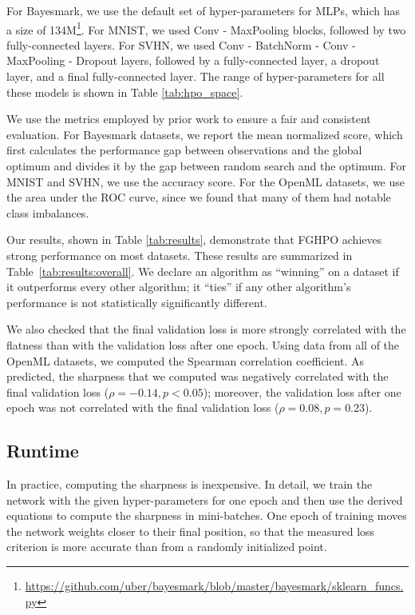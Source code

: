 \documentclass[preprint,12pt]{elsarticle}
\newcommand{\IT}{FGHPO}
\begin{document}
For Bayesmark, we use the default set of hyper-parameters for MLPs, which has a size of 134M\footnote{\url{https://github.com/uber/bayesmark/blob/master/bayesmark/sklearn_funcs.py}}. For MNIST, we used Conv - MaxPooling blocks, followed by two fully-connected layers. For SVHN, we used Conv - BatchNorm - Conv - MaxPooling - Dropout layers, followed by a fully-connected layer, a dropout layer, and a final fully-connected layer. The range of hyper-parameters for all these models is shown in Table \ref{tab:hpo_space}.

We use the metrics employed by prior work to ensure a fair and consistent evaluation. For Bayesmark datasets, we report the mean normalized score, which first calculates the performance gap between observations and the global optimum and divides it by the gap between random search and the optimum. For MNIST and SVHN, we use the accuracy score. For the OpenML datasets, we use the area under the ROC curve, since we found that many of them had notable class imbalances.



Our results, shown in Table \ref{tab:results}, demonstrate that {\IT} achieves strong performance on most datasets. These results are summarized in Table~\ref{tab:results:overall}. We declare an algorithm as ``winning'' on a dataset if it outperforms every other algorithm; it ``ties'' if any other algorithm's performance is not statistically significantly different.

We also checked that the final validation loss is more strongly correlated with the flatness than with the validation loss after one epoch. Using data from all of the OpenML datasets, we computed the Spearman correlation coefficient. As predicted, the sharpness that we computed was negatively correlated with the final validation loss ($\rho = -0.14, p < 0.05$); moreover, the validation loss after one epoch was not correlated with the final validation loss ($\rho = 0.08, p = 0.23$).

%

\subsection{Runtime}
\label{sec:runtime}

In practice, computing the sharpness is inexpensive. In detail, we train the network with the given hyper-parameters for one epoch and then use the derived equations to compute the sharpness in mini-batches. One epoch of training moves the network weights closer to their final position, so that the measured loss criterion is more accurate than from a randomly initialized point. 
\end{document}
